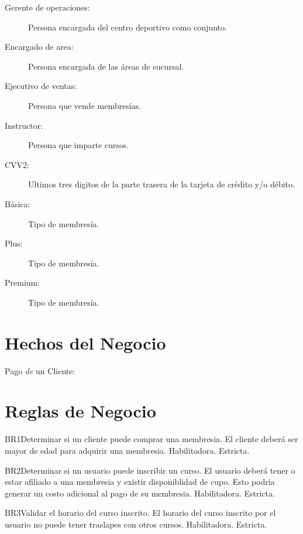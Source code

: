 \begin{description}
	\item[Gerente de operaciones:] Persona encargada del centro deportivo como conjunto.
	\item[Encargado de area:] Persona encargada de las áreas de sucursal.
	\item[Ejecutivo de ventas:] Persona que vende membresías.
	\item[Instructor:] Persona que imparte cursos.
	\item[CVV2:] Ultimos tres digitos de la parte trasera de la tarjeta de crédito y/o débito.
	\item[Básica:] Tipo de membresía.
	\item[Plus:] Tipo de membresía.
	\item[Premium:] Tipo de membresía.
\end{description}

\section{Hechos del Negocio}

\begin{description}
	\item[Pago {\em de} un Cliente:]
\end{description}

\section{Reglas de Negocio}

\begin{BussinesRule}{BR1}{Determinar si un cliente puede comprar una membresia.} 
	\BRitem[Descripción:] El cliente deberá ser mayor de edad para adquirir una membresia.
	\BRitem[Tipo:] Habilitadora.
	\BRitem[Nivel:] Estricta.
\end{BussinesRule}

\begin{BussinesRule}{BR2}{Determinar si un usuario puede inscribir un curso.}
	\BRitem[Descripción:] El usuario deberá tener o estar afiliado a una membresia y existir disponiblidad de cupo.
Esto podría generar un costo adicional al pago de su membresia.
	\BRitem[Tipo:] Habilitadora.
	\BRitem[Nivel:] Estricta.
\end{BussinesRule}

\begin{BussinesRule}{BR3}{Validar el horario del curso inscrito.}
	\BRitem[Descripción:] El horario del curso inscrito por el usuario no puede tener traslapes con otros cursos.
	\BRitem[Tipo:] Habilitadora.
	\BRitem[Nivel:] Estricta.
\end{BussinesRule}

